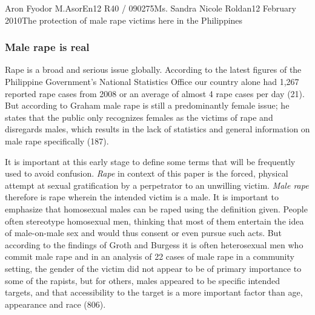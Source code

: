 \documentclass[12pt,letterpaper]{article}
\begin{document}
\begin{mla}{Aron Fyodor M.}{Asor}{En12 R40 / 090275}{Ms. Sandra Nicole Roldan}{12 February 2010}{The protection of male rape victims here in the Philippines}

\subsubsection{Male rape is real}
%
%
\tab Rape is a broad and serious issue globally. According to the latest figures of the Philippine Government's National Statistics Office our country alone had 1,267 reported rape cases from 2008 or an average of almost 4 rape cases per day (21). But according to Graham male rape is still a predominantly female issue; he states that the public only recognizes females as the victims of rape and disregards males, which results in the lack of statistics and general information on male rape specifically (187).

%
%
It is important at this early stage to define some terms that will be frequently used to avoid confusion. \textit{Rape} in context of this paper is the forced, physical attempt at sexual gratification by a perpetrator to an unwilling victim. \textit{Male rape} therefore is rape wherein the intended victim is a male. It is important to emphasize that homosexual males can  be raped using the definition given. People often stereotype homosexual men, thinking that most of them entertain the idea of male-on-male sex and would thus consent or even pursue such acts. But according to the findings of Groth and Burgess it is often heterosexual men who commit male rape and in an analysis of 22 cases of male rape in a community setting, the gender of the victim did not appear to be of primary importance to some of the rapists, but for others, males appeared to be specific intended targets, and that accessibility to the target is a more important factor than age, appearance and race (806).


\end{mla}
\end{document}
